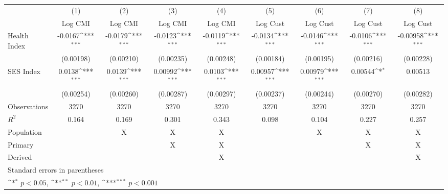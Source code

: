 {
\def\sym#1{\ifmmode^{#1}\else\(^{#1}\)\fi}
\begin{tabular}{l*{8}{c}}
\hline\hline
                    &\multicolumn{1}{c}{(1)}&\multicolumn{1}{c}{(2)}&\multicolumn{1}{c}{(3)}&\multicolumn{1}{c}{(4)}&\multicolumn{1}{c}{(5)}&\multicolumn{1}{c}{(6)}&\multicolumn{1}{c}{(7)}&\multicolumn{1}{c}{(8)}\\
                    &\multicolumn{1}{c}{Log CMI}&\multicolumn{1}{c}{Log CMI}&\multicolumn{1}{c}{Log CMI}&\multicolumn{1}{c}{Log CMI}&\multicolumn{1}{c}{Log Cust}&\multicolumn{1}{c}{Log Cust}&\multicolumn{1}{c}{Log Cust}&\multicolumn{1}{c}{Log Cust}\\
\hline
Health Index        &     -0.0167\sym{***}&     -0.0179\sym{***}&     -0.0123\sym{***}&     -0.0119\sym{***}&     -0.0134\sym{***}&     -0.0146\sym{***}&     -0.0106\sym{***}&    -0.00958\sym{***}\\
                    &   (0.00198)         &   (0.00210)         &   (0.00235)         &   (0.00248)         &   (0.00184)         &   (0.00195)         &   (0.00216)         &   (0.00228)         \\
[1em]
SES Index           &      0.0138\sym{***}&      0.0139\sym{***}&     0.00992\sym{***}&      0.0103\sym{***}&     0.00957\sym{***}&     0.00979\sym{***}&     0.00544\sym{*}  &     0.00513         \\
                    &   (0.00254)         &   (0.00260)         &   (0.00287)         &   (0.00297)         &   (0.00237)         &   (0.00244)         &   (0.00270)         &   (0.00282)         \\
\hline
Observations        &        3270         &        3270         &        3270         &        3270         &        3270         &        3270         &        3270         &        3270         \\
\(R^{2}\)           &       0.164         &       0.169         &       0.301         &       0.343         &       0.098         &       0.104         &       0.227         &       0.257         \\
Population          &                     &           X         &           X         &           X         &                     &           X         &           X         &           X         \\
Primary             &                     &                     &           X         &           X         &                     &                     &           X         &           X         \\
Derived             &                     &                     &                     &           X         &                     &                     &                     &           X         \\
\hline\hline
\multicolumn{9}{l}{\footnotesize Standard errors in parentheses}\\
\multicolumn{9}{l}{\footnotesize \sym{*} \(p<0.05\), \sym{**} \(p<0.01\), \sym{***} \(p<0.001\)}\\
\end{tabular}
}
